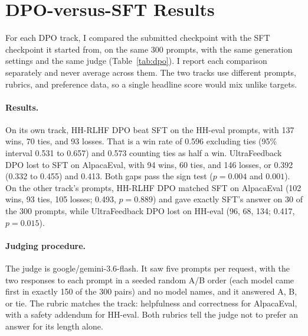 \section{DPO-versus-SFT Results}
\label{sec:results}

For each DPO track, I compared the submitted checkpoint with the SFT checkpoint it started from, on the same 300 prompts, with the same generation settings and the same judge (Table~\ref{tab:dpo}). I report each comparison separately and never average across them. The two tracks use different prompts, rubrics, and preference data, so a single headline score would mix unlike targets.

\begin{table}[!t]
\centering
\caption{Pairwise judge results for each DPO model against SFT on identical prompts: wins (W), ties (T), losses (L), unknown verdicts (Unk.), and judge calls beyond one per batch of five (extra calls). Win rate excluding ties is W/(W+L) with a 95\% Wilson interval, win rate with ties counts each tie as half a win, and the sign test is exact and two-sided on W against L. The plain rubric drops the length guidance, and the repetition penalty applies to both models.}
\label{tab:dpo}

\end{table}

\paragraph{Results.} On its own track, HH-RLHF DPO beat SFT on the HH-eval prompts, with 137 wins, 70 ties, and 93 losses. That is a win rate of 0.596 excluding ties (95\% interval 0.531 to 0.657) and 0.573 counting ties as half a win. UltraFeedback DPO lost to SFT on AlpacaEval, with 94 wins, 60 ties, and 146 losses, or 0.392 (0.332 to 0.455) and 0.413. Both gaps pass the sign test ($p=0.004$ and $0.001$). On the other track's prompts, HH-RLHF DPO matched SFT on AlpacaEval (102 wins, 93 ties, 105 losses; 0.493, $p=0.889$) and gave exactly SFT's answer on 30 of the 300 prompts, while UltraFeedback DPO lost on HH-eval (96, 68, 134; 0.417, $p=0.015$).

\paragraph{Judging procedure.} The judge is google/gemini-3.6-flash. It saw five prompts per request, with the two responses to each prompt in a seeded random A/B order (each model came first in exactly 150 of the 300 pairs) and no model names, and it answered A, B, or tie. The rubric matches the track: helpfulness and correctness for AlpacaEval, with a safety addendum for HH-eval. Both rubrics tell the judge not to prefer an answer for its length alone.

